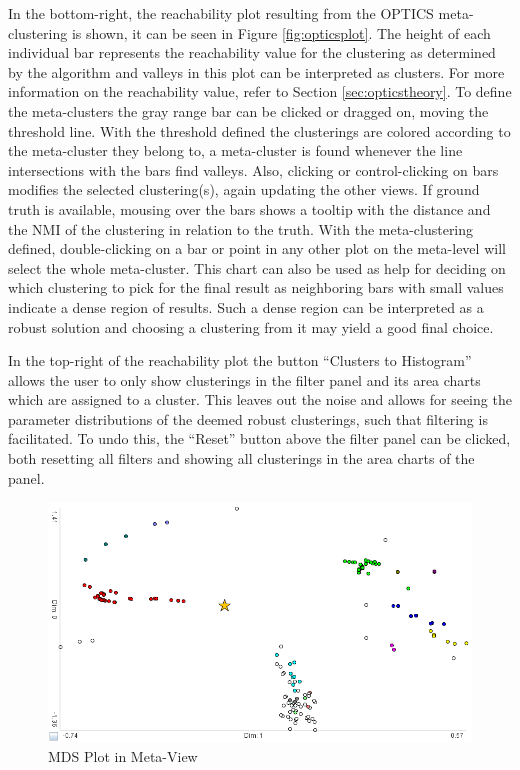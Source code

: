 \documentclass[
	a4paper,
	english,
	twoside,
	openright,               
	11pt                            
	]{report}
\begin{document}
In the bottom-right, the reachability plot resulting from the OPTICS meta-clustering is shown, it can be seen in Figure \ref{fig:opticsplot}. The height of each individual bar represents the reachability value for the clustering as determined by the algorithm and valleys in this plot can be interpreted as clusters. For more information on the reachability value, refer to Section \ref{sec:opticstheory}. To define the meta-clusters the gray range bar can be clicked or dragged on, moving the threshold line. With the threshold defined the clusterings are colored according to the meta-cluster they belong to, a meta-cluster is found whenever the line intersections with the bars find valleys. Also, clicking or control-clicking on bars modifies the selected clustering(s), again updating the other views. If ground truth is available, mousing over the bars shows a tooltip with the distance and the NMI of the clustering in relation to the truth. With the meta-clustering defined, double-clicking on a bar or point in any other plot on the meta-level will select the whole meta-cluster. This chart can also be used as help for deciding on which clustering to pick for the final result as neighboring bars with small values indicate a dense region of results. Such a dense region can be interpreted as a robust solution and choosing a clustering from it may yield a good final choice. 

In the top-right of the reachability plot the button ``Clusters to Histogram'' allows the user to only show clusterings in the filter panel and its area charts which are assigned to a cluster. This leaves out the noise and allows for seeing the parameter distributions of the deemed robust clusterings, such that filtering is facilitated. To undo this, the ``Reset'' button above the filter panel can be clicked, both resetting all filters and showing all clusterings in the area charts of the panel.

\begin{figure}[h]
	\centering
	\includegraphics[scale=.45]{mds-plot}
	\caption{MDS Plot in Meta-View}
	\label{fig:mdsplot}
\end{figure}
\end{document}
